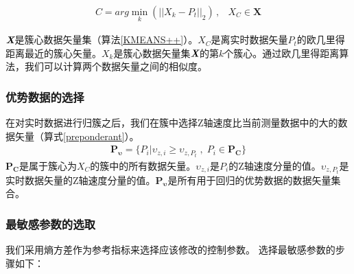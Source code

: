 \begin{eqnarray}\label{cluster}
C=arg\min \limits_{k}{(||X_{k}-P_{t}||_{2})} \, ,&X_{C}\in \bm{X}
\end{eqnarray}

$\textit{\textbf{X}}$是簇心数据矢量集（算法\ref{KMEANS++}）。$X_{C}$是离实时数据矢量$P_t$的欧几里得距离最近的簇心矢量。$X_{k}$是簇心数据矢量集$\textit{\textbf{X}}$的第$k$个簇心。通过欧几里得距离算法，我们可以计算两个数据矢量之间的相似度。

\subsubsection{优势数据的选择}
在对实时数据进行归簇之后，我们在簇中选择Z轴速度比当前测量数据中的大的数据矢量（算式\ref{preponderant}）。
\begin{eqnarray}\label{preponderant}
\bm{P_{\upsilon}}=\{P_{i} | \upsilon_{z,i}\geq \upsilon_{z,P_{t}} \; , \; P_{i}\in \bm{P_{C}}\}
\end{eqnarray}
$\bm{P_{C}}$是属于簇心为$X_{C}$的簇中的所有数据矢量。$\upsilon_{z,i}$是$P_{i}$的Z轴速度分量的值。$\upsilon_{z,P_{t}}$是实时数据矢量的Z轴速度分量的值。$\bm{P_{\upsilon}}$是所有用于回归的优势数据的数据矢量集合。

\subsubsection{最敏感参数的选取}
我们采用熵方差作为参考指标来选择应该修改的控制参数。 选择最敏感参数的步骤如下：

